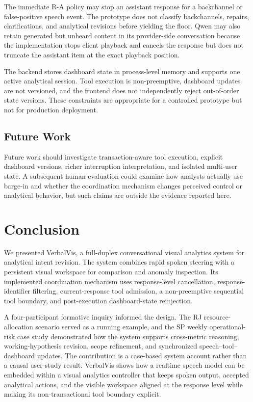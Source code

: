 \documentclass[journal]{IEEEtran}
\begin{document}
The immediate R-A policy may stop an assistant response for a backchannel or false-positive speech event. The prototype does not classify backchannels, repairs, clarifications, and analytical revisions before yielding the floor. Qwen may also retain generated but unheard content in its provider-side conversation because the implementation stops client playback and cancels the response but does not truncate the assistant item at the exact playback position.

The backend stores dashboard state in process-level memory and supports one active analytical session. Tool execution is non-preemptive, dashboard updates are not versioned, and the frontend does not independently reject out-of-order state versions. These constraints are appropriate for a controlled prototype but not for production deployment.

\subsection{Future Work}

Future work should investigate transaction-aware tool execution, explicit dashboard versions, richer interruption interpretation, and isolated multi-user state. A subsequent human evaluation could examine how analysts actually use barge-in and whether the coordination mechanism changes perceived control or analytical behavior, but such claims are outside the evidence reported here.

\section{Conclusion}
\label{sec:conclusion}

We presented VerbalVis, a full-duplex conversational visual analytics system for analytical intent revision. The system combines rapid spoken steering with a persistent visual workspace for comparison and anomaly inspection. Its implemented coordination mechanism uses response-level cancellation, response-identifier filtering, current-response tool admission, a non-preemptive sequential tool boundary, and post-execution dashboard-state reinjection.

A four-participant formative inquiry informed the design. The RJ resource-allocation scenario served as a running example, and the SP weekly operational-risk case study demonstrated how the system supports cross-metric reasoning, working-hypothesis revision, scope refinement, and synchronized speech--tool--dashboard updates. The contribution is a case-based system account rather than a causal user-study result. VerbalVis shows how a realtime speech model can be embedded within a visual analytics controller that keeps spoken output, accepted analytical actions, and the visible workspace aligned at the response level while making its non-transactional tool boundary explicit.



\end{document}
